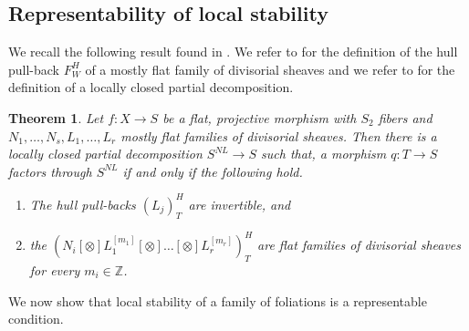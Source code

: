\documentclass[12pt, a4paper]{amsart}
\newcommand\ZZ{\mathbb{Z}}
\newcounter{Theorem}
\newtheorem{theorem}{Theorem}[section]
\theoremstyle{definition}
\theoremstyle{named}
\begin{document}
\subsection{Representability of local stability}


We recall the following result found in \cite[Proposition 3.31]{modbook}.
We refer to \cite[Defintion 3.27]{modbook} for the definition 
of the hull pull-back $F^H_W$ of a mostly flat family of divisorial sheaves and
  we refer to \cite[Definition 10.83]{modbook} for the definition of a locally closed partial decomposition.


\begin{theorem}
\label{t_prop3.31}
    Let $f:X\to S$ be a flat, projective morphism with $S_2$ fibers and $N_1,\dots,N_s,L_1,\dots,L_r$ mostly flat families of divisorial sheaves. Then there is a locally closed partial decomposition $S^{NL} \to S$ such that, a morphism $q: T\to S$ factors through $S^{NL}$ if and only if the following hold.
    \begin{enumerate}
        \item The hull pull-backs $(L_j)^H_T$ are invertible, and
        \item the $(N_i[\otimes] L_1^{[m_1]}[\otimes]\dots[\otimes]L_r^{[m_r]})^H_T$ are flat families of divisorial sheaves for every $m_i\in \ZZ$.
    \end{enumerate}
\end{theorem}


We now show that local stability of a family of foliations is a representable condition.
\end{document}
